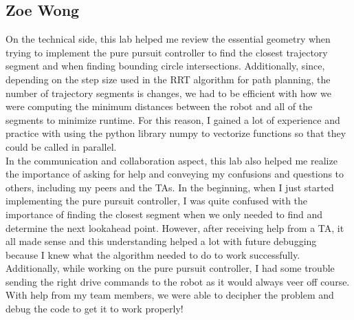 \documentclass{article}
\begin{document}
\subsection{Zoe Wong}

On the technical side, this lab helped me review the essential geometry when trying to implement the pure pursuit controller to find the closest trajectory segment and when finding bounding circle intersections. Additionally, since, depending on the step size used in the RRT algorithm for path planning, the number of trajectory segments is changes, we had to be efficient with how we were computing the minimum distances between the robot and all of the segments to minimize runtime. For this reason, I gained a lot of experience and practice with using the python library numpy to vectorize functions so that they could be called in parallel.\\

In the communication and collaboration aspect, this lab also helped me realize the importance of asking for help and conveying my confusions and questions to others, including my peers and the TAs. In the beginning, when I just started implementing the pure pursuit controller, I was quite confused with the importance of finding the closest segment when we only needed to find and determine the next lookahead point. However, after receiving help from a TA, it all made sense and this understanding helped a lot with future debugging because I knew what the algorithm needed to do to work successfully. Additionally, while working on the pure pursuit controller, I had some trouble sending the right drive commands to the robot as it would always veer off course. With help from my team members, we were able to decipher the problem and debug the code to get it to work properly!\\

\end{document}
